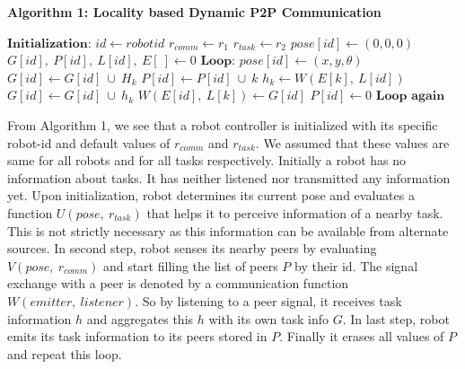 \documentclass[letterpaper, 10 pt, times, conference]{ieeeconf} %
\begin{document}
\textbf{\small Algorithm 1: Locality based Dynamic P2P Communication}
\begin{algorithmic}[1]
\label{alg:p2p-comm}
\State $\textbf{Initialization:}$
\State $id \gets robotid$
\State $r_{comm} \gets r_1$
\State $r_{task} \gets r_2$
\State $pose[id] \gets (0, 0, 0)$
\State $G[id], ~P[id], ~L[id], ~E[~] \gets 0$
\State $\textbf{Loop:}$
\State $pose[id] \gets (x, y, \theta)$
\State $G[id] \gets G[id] ~\cup ~ H_k$
\EndIf
\State $P[id] \gets P[id] ~ \cup ~ k$
\State $h_k \gets W(E[k],~ L[id])$
\State $G[id] \gets G[id] ~ \cup ~ h_k$
\EndIf
\State $ W(E[id],~L[k]) \gets G[id]$
\EndFor
\State $P[id] \gets 0$
\State $\textbf{Loop again}$
\end{algorithmic}
%
From Algorithm 1, we see that a robot controller is initialized with its specific robot-id and default values of $r_{comm}$ and $r_{task}$. We assumed that these values are same for all robots and for all tasks respectively.
Initially a robot has no information about tasks. It has neither listened nor transmitted any information yet. Upon initialization, robot determines its current pose and evaluates a function $U(pose,~ r_{task})$ that helps it to perceive information of a nearby task. This is not strictly necessary as this information can be available from alternate sources. In second step, robot senses its nearby peers by evaluating $V(pose,~ r_{comm})$ and start filling the list of peers $P$ by their id. The signal exchange with a peer is denoted by a communication function $W(emitter,~listener)$. So by listening to a peer signal, it receives task information $h$ and aggregates this $h$ with its own task info $G$. In last step, robot emits its task information to its peers stored in $P$. Finally it erases all values of $P$ and repeat this loop. 
%
\end{document}
